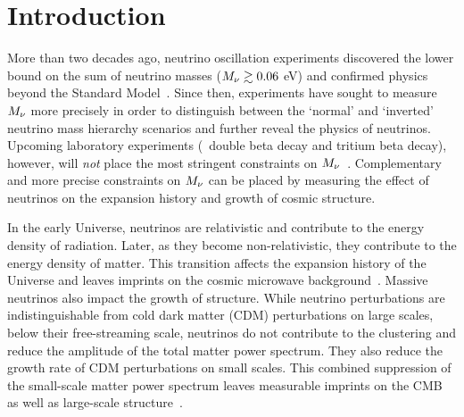 \section{Introduction} \label{sec:intro}
More than two decades ago, neutrino oscillation experiments discovered the lower
bound on the sum of neutrino masses ($M_\nu \gtrsim 0.06$ eV) and confirmed
physics beyond the Standard Model~\citep{fukuda1998, forero2014, gonzalez-garcia2016}. 
Since then, experiments have sought to measure $M_\nu$ more precisely in order
to distinguish between the `normal' and `inverted' neutrino mass hierarchy
scenarios and further reveal the physics of neutrinos. Upcoming laboratory 
experiments (\eg~double beta decay and tritium beta decay), however, will {\em
not} place the most stringent constraints on $M_\nu$~\citep{bonn2011,
drexlin2013}.
Complementary and more precise constraints on $M_\nu$ can be
placed by measuring the effect of neutrinos on the expansion history and growth
of cosmic structure. 

In the early Universe, neutrinos are relativistic and contribute to the 
energy density of radiation. Later, as they become non-relativistic, 
they contribute to the energy density of matter. This transition affects 
the expansion history of the Universe and leaves imprints on the cosmic
microwave background~\citep[CMB;][]{lesgourgues2012, lesgourgues2014}. 
Massive neutrinos also impact the growth of structure. 
While neutrino perturbations are indistinguishable from cold dark matter (CDM)
perturbations on large scales, below their free-streaming scale, neutrinos 
do not contribute to the clustering and reduce the 
amplitude of the total matter power spectrum. They also reduce the growth 
rate of CDM perturbations on small scales. This combined suppression of 
the small-scale matter power spectrum leaves measurable imprints 
on the CMB as well as large-scale structure~\citep[for further details see][]{lesgourgues2012, lesgourgues2014, gerbino2018}. 

